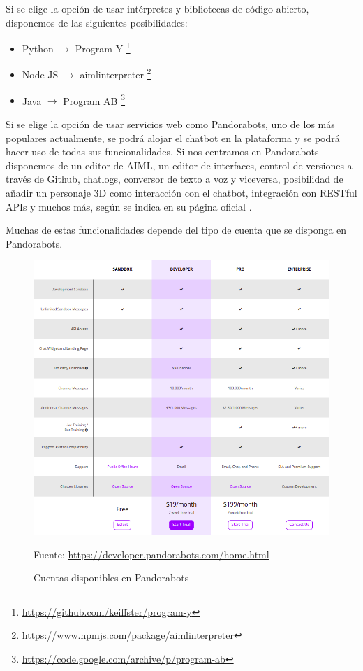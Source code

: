Si se elige la opción de usar intérpretes y bibliotecas de código abierto, disponemos de las siguientes posibilidades:

\begin{itemize}
\item Python $\rightarrow$ Program-Y \footnote{\url{https://github.com/keiffster/program-y}}
\item Node JS $\rightarrow$ aimlinterpreter
\footnote{\url{https://www.npmjs.com/package/aimlinterpreter}}
\item Java $\rightarrow$ Program AB \footnote{\url{https://code.google.com/archive/p/program-ab}}
\end{itemize}

Si se elige la opción de usar servicios web como Pandorabots, uno de los más populares actualmente, se podrá alojar el chatbot en la plataforma y se podrá hacer uso de todas sus funcionalidades. Si nos centramos en Pandorabots disponemos de un editor de AIML, un editor de interfaces, control de versiones a través de Github, chatlogs, conversor de texto a voz y viceversa, posibilidad de añadir un personaje 3D como interacción con el chatbot, integración con RESTful \glspl{API} y muchos más, según se indica en su página oficial \cite{RefWorks:RefID:14-pandorabots:}.

Muchas de estas funcionalidades depende del tipo de cuenta que se disponga en Pandorabots.

\newpage

\begin{figure}[h]
\centering
\includegraphics[width=1.0\textwidth]{imagenes/02_EstadoDelArte/cuentas_pandorabots.png}
\begin{center}
Fuente: \url{https://developer.pandorabots.com/home.html}
\end{center}
\caption{Cuentas disponibles en Pandorabots}
\label{fig:cuenta_pandorabots}
\end{figure}

